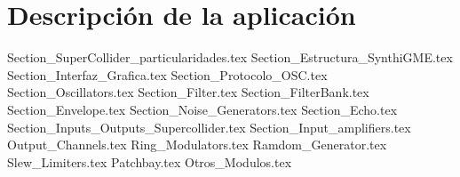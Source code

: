 \chapter{Descripción de la aplicación}


	{Section_SuperCollider_particularidades.tex}
	{Section_Estructura_SynthiGME.tex}
	{Section_Interfaz_Grafica.tex}
	{Section_Protocolo_OSC.tex}
	{Section_Oscillators.tex}
	{Section_Filter.tex}	
	{Section_FilterBank.tex}	
	{Section_Envelope.tex}	
	{Section_Noise_Generators.tex}
	{Section_Echo.tex}
	{Section_Inputs_Outputs_Supercollider.tex}
	{Section_Input_amplifiers.tex}
	{Output_Channels.tex}
	{Ring_Modulators.tex}
	{Ramdom_Generator.tex}
	{Slew_Limiters.tex}
	{Patchbay.tex}
	{Otros_Modulos.tex}